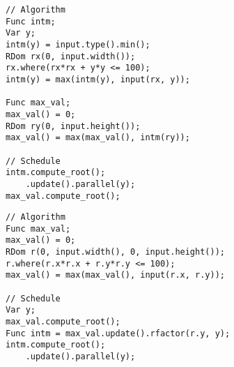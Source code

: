 \begin{lstlisting}[caption={Manually factoring this reduction requires also manipulating the predicate associated with the RDom. The identity for \code{max} is the minimum value of the type in question.}, label={lst:circular_max_2}]
// Algorithm
Func intm;
Var y;
intm(y) = input.type().min();
RDom rx(0, input.width());
rx.where(rx*rx + y*y <= 100);
intm(y) = max(intm(y), input(rx, y));

Func max_val;
max_val() = 0;
RDom ry(0, input.height());
max_val() = max(max_val(), intm(ry));

// Schedule
intm.compute_root();
    .update().parallel(y);
max_val.compute_root();
\end{lstlisting}

\begin{lstlisting}[caption={Using \code{rfactor} in the schedule can produce the same machine code from the simpler form of the algorithm.}]
// Algorithm
Func max_val;
max_val() = 0;
RDom r(0, input.width(), 0, input.height());
r.where(r.x*r.x + r.y*r.y <= 100);
max_val() = max(max_val(), input(r.x, r.y));

// Schedule
Var y;
max_val.compute_root();
Func intm = max_val.update().rfactor(r.y, y);
intm.compute_root();
    .update().parallel(y);
\end{lstlisting}


